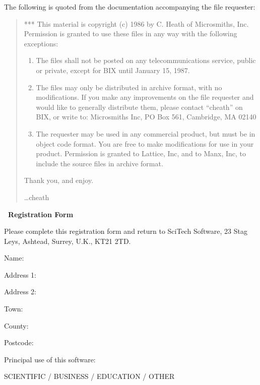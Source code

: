 The following is quoted from the documentation accompanying the file
requester:
\begin{quotation}
***	This material is copyright (c) 1986 by C. Heath of Microsmiths, Inc.
Permission is granted to use these files in any way with the following
exceptions:
\begin{enumerate}
\item The files shall not be posted on any telecommunications service, public
or private, except for BIX until January 15, 1987.

\item The files may only be distributed in archive format, with no modifications.
If you make any improvements on the file requester and would like to
generally distribute them, please contact ``cheath'' on BIX, or write to:
	Microsmiths Inc, PO Box 561, Cambridge, MA 02140

\item The requester may be used in any commercial product, but must be in
object code format.  You are free to make modifications for use in your
product.  Permission is granted to Lattice, Inc, and to Manx, Inc, to
include the source files in archive format.
\end{enumerate}

	Thank you, and enjoy.
   
		\ldots cheath

\end{quotation}

\newpage

\newpage
\thispagestyle{empty}
\begin{center}
\Large\amplot\bf\ Registration Form
\end{center}
\vspace*{1ex}
Please complete this registration form and return to {\sf SciTech Software}, 23 
Stag Leys, Ashtead, Surrey, U.K., KT21 2TD.
\vspace*{3em}

Name:\hrulefill

Address 1:\hrulefill

Address 2:\hrulefill

Town:\hrulefill

County:\hrulefill

Postcode:\hrulefill

\vspace*{2em}

Principal use of this software:

SCIENTIFIC / BUSINESS / EDUCATION / OTHER\hrulefill

